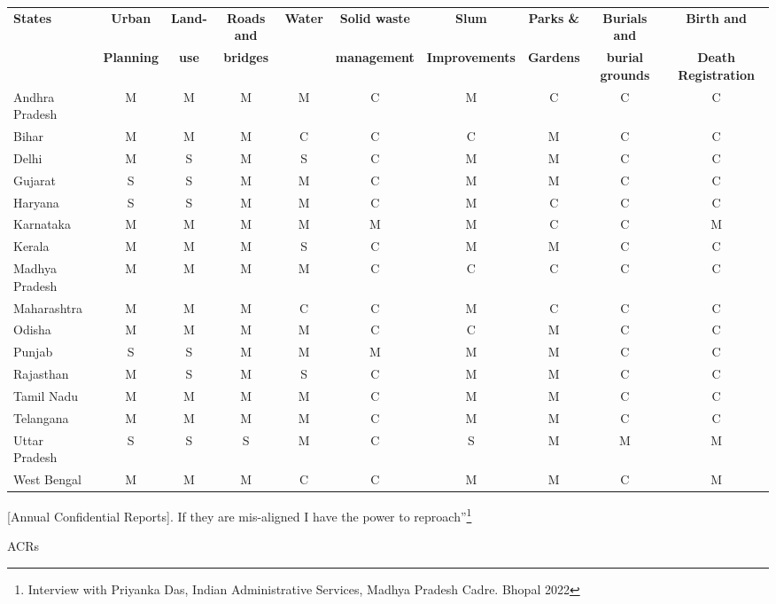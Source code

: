 \begin{table}[ht]
\centering
\begin{tabular}{|l|c|c|c|c|c|c|c|c|c|}
\hline
\textbf{States} & \textbf{Urban} & \textbf{Land-} & \textbf{Roads and} & \textbf{Water} & \textbf{Solid waste} & \textbf{Slum} & \textbf{Parks \&} & \textbf{Burials and} & \textbf{Birth and} \\
 & \textbf{Planning} & \textbf{use} & \textbf{bridges} & & \textbf{management} & \textbf{Improvements} & \textbf{Gardens} & \textbf{burial grounds} & \textbf{Death Registration} \\
\hline
Andhra Pradesh & M & M & M & M & C & M & C & C & C \\
\hline
Bihar & M & M & M & C & C & C & M & C & C \\
\hline
Delhi & M & S & M & S & C & M & M & C & C \\
\hline
Gujarat & S & S & M & M & C & M & M & C & C \\
\hline
Haryana & S & S & M & M & C & M & C & C & C \\
\hline
Karnataka & M & M & M & M & M & M & C & C & M \\
\hline
Kerala & M & M & M & S & C & M & M & C & C \\
\hline
Madhya Pradesh & M & M & M & M & C & C & C & C & C \\
\hline
Maharashtra & M & M & M & C & C & M & C & C & C \\
\hline
Odisha & M & M & M & M & C & C & M & C & C \\
\hline
Punjab & S & S & M & M & M & M & M & C & C \\
\hline
Rajasthan & M & S & M & S & C & M & M & C & C \\
\hline
Tamil Nadu & M & M & M & M & C & M & M & C & C \\
\hline
Telangana & M & M & M & M & C & M & M & C & C \\
\hline
Uttar Pradesh & S & S & S & M & C & S & M & M & M \\
\hline
West Bengal & M & M & M & C & C & M & M & C & M \\
\hline
\end{tabular}
\end{table}

[Annual Confidential Reports]. If they are mis-aligned I have the power to reproach''\footnote{Interview with Priyanka Das, Indian Administrative Services, Madhya Pradesh Cadre. Bhopal 2022}

ACRs

